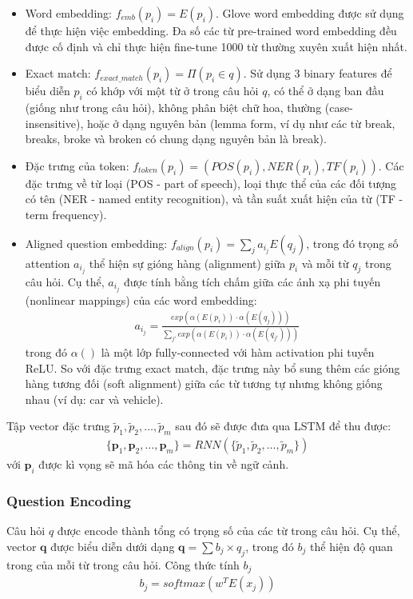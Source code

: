 \begin{itemize}
    \item Word embedding: $f_{emb}(p_i) = E(p_i)$. Glove word embedding được sử dụng để thực hiện việc embedding. Đa số các từ pre-trained word embedding đều được cố định và chỉ thực hiện fine-tune 1000 từ thường xuyên xuất hiện nhất. 
    \item Exact match: $f_{exact\_match}(p_i) = \Pi(p_i \in q)$. Sử dụng 3 binary features để biểu diễn $p_i$ có khớp với một từ ở trong câu hỏi $q$, có thể ở dạng ban đầu (giống như trong câu hỏi), không phân biệt chữ hoa, thường (case-insensitive), hoặc ở dạng nguyên bản (lemma form, ví dụ như các từ break, breaks, broke và broken có chung dạng nguyên bản là break).
    \item Đặc trưng của token: $f_{token}(p_i) = (POS(p_i), NER(p_i), TF(p_i))$. Các đặc trưng về từ loại (POS - part of speech), loại thực thể của các đối tượng có tên (NER - named entity recognition), và tần suất xuất hiện của từ (TF - term frequency). 
    \item Aligned question embedding:
    $f_{align}(p_i) = \sum_j a_i_j E(q_j)$, trong đó trọng số attention $a_i_j$ thể hiện sự gióng hàng (alignment) giữa $p_i$ và mỗi từ $q_j$ trong câu hỏi. Cụ thể, $a_i_j$ được tính bằng tích chấm giữa các ánh xạ phi tuyến (nonlinear mappings) của các word embedding:
    \begin{gather*}
        a_i_j = \frac{exp(\alpha(E(p_i)) \cdot \alpha(E(q_j)))}{\sum_{j'} exp(\alpha(E(p_i)) \cdot \alpha(E(q_{j'})))}
    \end{gather*}
    trong đó $\alpha()$ là một lớp fully-connected với hàm activation phi tuyến ReLU. So với đặc trưng exact match, đặc trưng này bổ sung thêm các gióng hàng tương đối (soft alignment) giữa các từ tương tự nhưng không giống nhau (ví dụ: car và vehicle). 
\end{itemize}

Tập vector đặc trưng $\tilde{p}_{1}, \tilde{p}_{2}, \dots, \tilde{p}_{m}$ sau đó sẽ được đưa qua LSTM để thu được:
\begin{gather*}
   \{\textbf{p}_{1}, \textbf{p}_{2}, \dots, \textbf{p}_{m}\} = RNN(\{\tilde{p}_{1},\tilde{p}_{2}, \dots, \tilde{p}_{m}\})
\end{gather*}
với $\textbf{p}_{i}$ được kì vọng sẽ mã hóa các thông tin về ngữ cảnh.

\subsubsection{Question Encoding}
Câu hỏi $q$ được encode thành tổng có trọng số của các từ trong câu hỏi. Cụ thể, vector $\textbf{q}$ được biểu diễn dưới dạng $\textbf{q} = \sum b_j \times q_j$, trong đó $b_j$ thể hiện độ quan trong của mỗi từ trong câu hỏi. Công thức tính $b_j$
\begin{gather*}
    b_j = softmax(w^T E(x_j))
\end{gather*}

